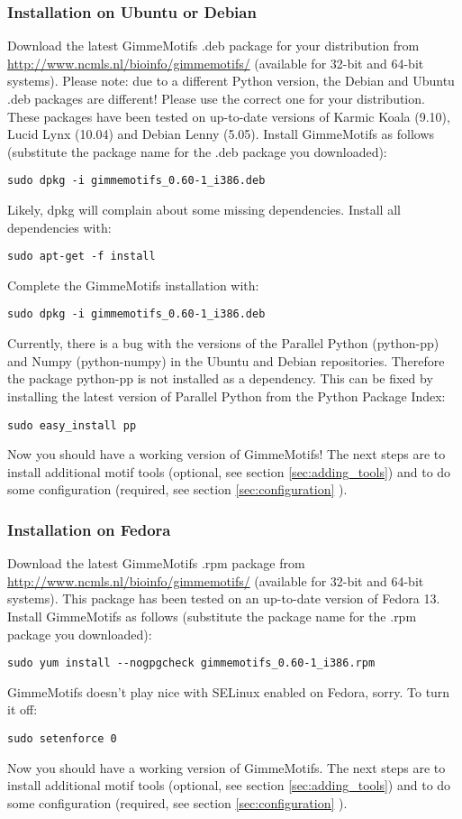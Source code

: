 \documentclass[11pt]{article}
\begin{document}
\subsubsection{Installation on Ubuntu or Debian}
Download the latest GimmeMotifs .deb package for your distribution  from \url{http://www.ncmls.nl/bioinfo/gimmemotifs/} (available for 32-bit and 64-bit systems). Please note: due to a different Python version, the Debian and Ubuntu .deb packages are different! Please use the correct one for your distribution.
These packages have been tested on up-to-date versions of Karmic Koala (9.10), Lucid Lynx (10.04) and Debian Lenny (5.05). 
Install GimmeMotifs as follows (substitute the package name for the .deb package you downloaded):
\begin{verbatim}
sudo dpkg -i gimmemotifs_0.60-1_i386.deb 
\end{verbatim}
Likely, dpkg will complain about some missing dependencies. Install all dependencies with:
\begin{verbatim}
sudo apt-get -f install
\end{verbatim}
Complete the GimmeMotifs installation with:
\begin{verbatim}
sudo dpkg -i gimmemotifs_0.60-1_i386.deb 
\end{verbatim}
Currently, there is a bug with the versions of the Parallel Python (python-pp) and Numpy (python-numpy) in the Ubuntu and Debian repositories. Therefore the package python-pp is not installed as a dependency. This can be fixed by installing the latest version of Parallel Python from the Python Package Index:
\begin{verbatim}
sudo easy_install pp 
\end{verbatim}
Now you should have a working version of GimmeMotifs! The next steps are to install additional motif tools (optional, see section \ref{sec:adding_tools}) and to do some configuration (required, see section \ref{sec:configuration} ).

\subsubsection{Installation on Fedora}
Download the latest GimmeMotifs .rpm package from \url{http://www.ncmls.nl/bioinfo/gimmemotifs/} (available for 32-bit and 64-bit systems). This package has been tested on an up-to-date version of Fedora 13. Install GimmeMotifs as follows (substitute the package name for the .rpm package you downloaded):
\begin{verbatim}
sudo yum install --nogpgcheck gimmemotifs_0.60-1_i386.rpm 
\end{verbatim}
GimmeMotifs doesn't play nice with SELinux enabled on Fedora, sorry. To turn it off:
\begin{verbatim}
sudo setenforce 0
\end{verbatim}
Now you should have a working version of GimmeMotifs. The next steps are to install additional motif tools (optional, see section \ref{sec:adding_tools}) and to do some configuration (required, see section \ref{sec:configuration} ).
\end{document}

